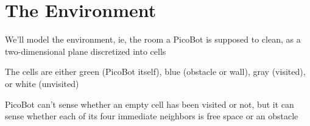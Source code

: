 \documentclass[8pt,a4paper,compress]{beamer}
\begin{document}
\section{The Environment}
\begin{frame}[fragile]
\pause

We'll model the environment, ie, the room a PicoBot is supposed to clean, as a two-dimensional plane discretized into cells

\begin{center}
\end{center}

\pause

The cells are either green (PicoBot itself), blue (obstacle or wall), gray (visited), or white (unvisited)

\pause
\bigskip

PicoBot can't sense whether an empty cell has been visited or not, but it can sense whether each of its four immediate neighbors is free space or an obstacle
\end{frame}
\end{document}
